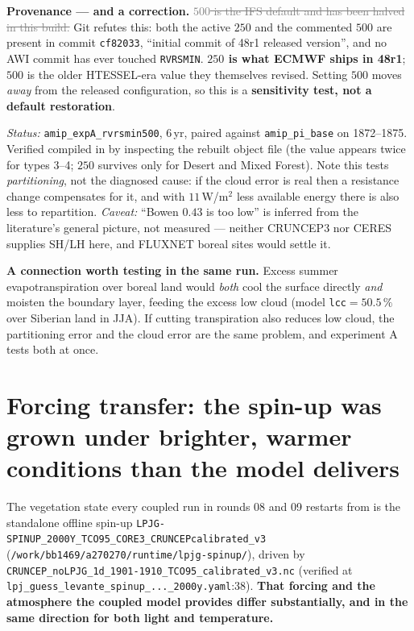 \documentclass[10pt]{article}
\newcommand{\dead}[1]{\textcolor{gray}{\sout{#1}}}
\begin{document}
\textbf{Provenance --- and a correction.} \dead{$500$ is the IFS default and has been halved in this build.}
Git refutes this: both the active $250$ and the commented $500$ are present in
commit \texttt{cf82033}, ``initial commit of 48r1 released version'', and no AWI commit has ever touched
\texttt{RVRSMIN}. \textbf{$250$ is what ECMWF ships in 48r1}; $500$ is the older HTESSEL-era value they
themselves revised. Setting $500$ moves \emph{away} from the released configuration, so this is a
\textbf{sensitivity test, not a default restoration}.

\emph{Status:} \texttt{amip\_expA\_rvrsmin500}, 6\,yr, paired against \texttt{amip\_pi\_base} on 1872--1875.
Verified compiled in by inspecting the rebuilt object file (the value appears twice for types 3--4; $250$
survives only for Desert and Mixed Forest). Note this tests \emph{partitioning}, not the diagnosed cause: if
the cloud error is real then a resistance change compensates for it, and with $11$\,W/m$^2$ less available
energy there is also less to repartition. \emph{Caveat:} ``Bowen $0.43$ is too low'' is inferred from the
literature's general picture, not measured --- neither CRUNCEP3 nor CERES supplies SH/LH here, and FLUXNET
boreal sites would settle it.

\textbf{A connection worth testing in the same run.} Excess summer evapotranspiration over boreal land would
\emph{both} cool the surface directly \emph{and} moisten the boundary layer, feeding the excess low cloud
(model \texttt{lcc}$=50.5\,\%$ over Siberian land in JJA). If cutting transpiration also reduces low cloud,
the partitioning error and the cloud error are the same problem, and experiment A tests both at once.

\section{Forcing transfer: the spin-up was grown under brighter, warmer conditions than the model delivers}\label{sec:calibmismatch}
The vegetation state every coupled run in rounds 08 and 09 restarts from is the standalone offline spin-up
\texttt{LPJG-SPINUP\_2000Y\_TCO95\_CORE3\_CRUNCEPcalibrated\_v3}
(\texttt{/work/bb1469/a270270/runtime/lpjg-spinup/}), driven by
\texttt{CRUNCEP\_noLPJG\_1d\_1901-1910\_TCO95\_calibrated\_v3.nc} (verified at
\texttt{lpj\_guess\_levante\_spinup\_...\_2000y.yaml}:38). \textbf{That forcing and the atmosphere the coupled
model provides differ substantially, and in the same direction for both light and temperature.}
\end{document}
